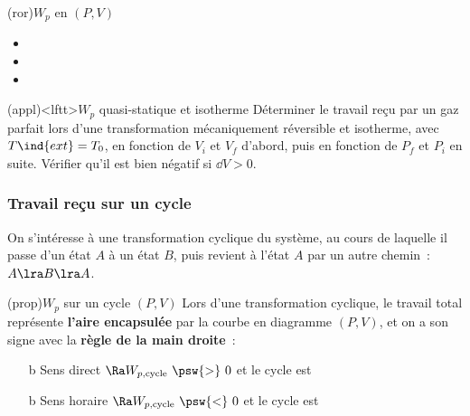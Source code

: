 \documentclass[../../main/main.tex]{subfiles}
\begin{document}
\begin{tcb*}(ror){$W_p$ en $(P,V)$}
	\begin{itemize}
		\item {}
		\item {}
		\item {}
	\end{itemize}
\end{tcb*}

\begin{tcb*}(appl)<lftt>{$W_p$ quasi-statique et isotherme}
	Déterminer le travail reçu par un gaz parfait lors d'une transformation
	mécaniquement réversible et isotherme, avec $T\ind{ext} = T_0$, en fonction de
	$V_i$ et $V_f$ d'abord, puis en fonction de $P_f$ et $P_i$ en suite. Vérifier
	qu'il est bien négatif si $\dd{V} > 0$.
	\tcblower
\end{tcb*}

\subsubsection{Travail reçu sur un cycle}
On s'intéresse à une transformation cyclique du système, au cours de laquelle il
passe d'un état $A$ à un état $B$, puis revient à l'état $A$ par un autre
chemin~: $A \lra B \lra A$.

\begin{tcb*}(prop){$W_p$ sur un cycle $(P,V)$}
	Lors d'une transformation cyclique, le travail total représente \textbf{l'aire
		encapsulée} par la courbe en diagramme $(P,V)$, et on a son signe avec la
	\textbf{règle de la main droite}~:
	\begin{itemize}
		\item[b]{Sens direct} $\Ra W_{p,\rm cycle}~\psw{>}~0$ et le cycle est
		\item[b]{Sens horaire} $\Ra W_{p,\rm cycle}~\psw{<}~0$ et le cycle est
	\end{itemize}
\end{tcb*}
\end{document}

